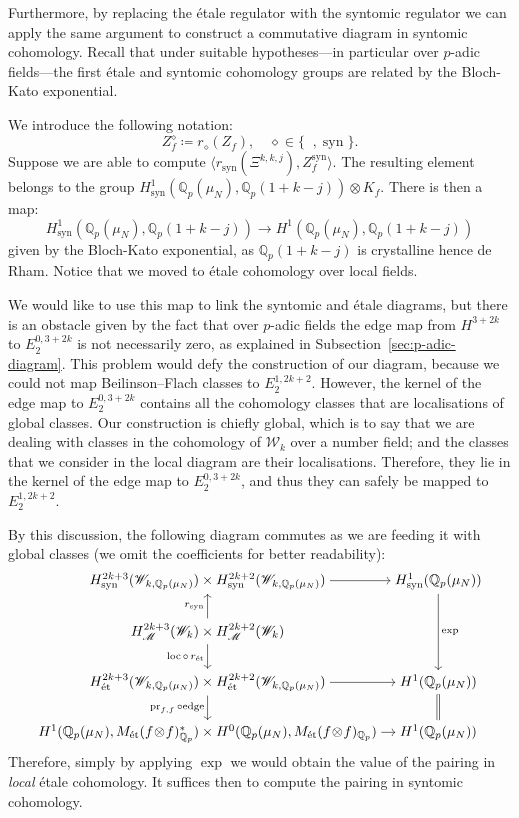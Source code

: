 \documentclass[11pt, a4paper, reqno]{amsart}
\theoremstyle{definition}
\theoremstyle{plain}
\theoremstyle{remark}
\DeclareMathOperator{\et}{\acute{e}t}
\DeclareMathOperator{\syn}{syn}
\DeclareMathOperator{\mot}{\mathscr{M}}
\DeclareMathOperator{\pr}{pr}
\newcommand{\numberset}{\mathbb}
\newcommand{\Q}{\numberset{Q}}
\newcommand{\KS}{\mathscr{W}}
\newcommand{\cBF}{\Xi}
\newcommand{\regulator}[1]{r_{#1}}
\newcommand{\ret}{\regulator{\et}}
\newcommand{\rsyn}{\regulator{\syn}}
\begin{document}
  Furthermore, by replacing the étale regulator with the syntomic regulator we can apply the same argument to construct a commutative diagram in syntomic cohomology. Recall that under suitable hypotheses---in particular over $p$-adic fields---the first étale and syntomic cohomology groups are related by the Bloch-Kato exponential.
  
  We introduce the following notation:
  \[
      Z_f^{\diamond} \coloneqq \regulator{\diamond}(Z_f), \quad \diamond\in\{\et,\syn\}.
  \]
  Suppose we are able to compute $\langle \rsyn(\cBF^{k,k,j}), Z_f^{\syn} \rangle$. The resulting element belongs to the group $H^1_{\syn}(\Q_p(\mu_N), \Q_p(1+k-j))\otimes K_f$. There is then a map:
  \[
   H^1_{\syn}(\Q_p(\mu_N),\Q_p(1+k-j)) \to H^1(\Q_p(\mu_N),\Q_p(1+k-j))
  \]
  given by the Bloch-Kato exponential, as $\Q_p(1+k-j)$ is crystalline hence de Rham. Notice that we moved to étale cohomology over local fields.
  
  We would like to use this map to link the syntomic and étale diagrams, but there is an obstacle given by the fact that over $p$-adic fields the edge map from $H^{3+2k}_{\et}$ to $E_2^{0,3+2k}$ is not necessarily zero, as explained in Subsection~\ref{sec:p-adic-diagram}. This problem would defy the construction of our diagram, because we could not map Beilinson--Flach classes to $E_2^{1,2k+2}$. However, the kernel of the edge map to $E_2^{0,3+2k}$ contains all the cohomology classes that are localisations of global classes. Our construction is chiefly global, which is to say that we are dealing with classes in the cohomology of $\KS_k$ over a number field; and the classes that we consider in the local diagram are their localisations. Therefore, they lie in the kernel of the edge map to $E_2^{0,3+2k}$, and thus they can safely be mapped to $E_2^{1,2k+2}$.
  
  By this discussion, the following diagram commutes as we are feeding it with global classes (we omit the coefficients for better readability):
  \[
      \begin{tikzcd}[column sep=0.7em,cramped]
          H_{\syn}^{2k+3}(\KS_{k,\Q_p(\mu_N)}) \times H_{\syn}^{2k+2}(\KS_{k,\Q_p(\mu_N)}) \arrow{r} & H^1_{\syn}(\Q_p(\mu_N)) \arrow["\exp"]{dd} \\
       H_{\mot}^{2k+3}(\KS_k) \times H_{\mot}^{2k+2}(\KS_k) \arrow["\rsyn"]{u} \arrow["\mathrm{loc}\,\circ\,\ret"']{d} & \\
       H_{\et}^{2k+3}(\KS_{k,\Q_p(\mu_N)}) \times H_{\et}^{2k+2}(\KS_{k,\Q_p(\mu_N)}) \arrow{r} \arrow["\pr_{f,f}\circ\mathrm{edge}"']{d} &  H^1(\Q_p(\mu_N)) \arrow[equal]{d} \\
       H^1(\Q_p(\mu_N),M_{\et}(f\! \otimes\! f)^*_{\Q_p}) \times H^0(\Q_p(\mu_N),M_{\et}(f\! \otimes\! f)_{\Q_p}) \arrow{r} &  H^1(\Q_p(\mu_N))
      \end{tikzcd}
  \]
  Therefore, simply by applying $\exp$ we would obtain the value of the pairing in \emph{local} étale cohomology. It suffices then to compute the pairing in syntomic cohomology.
  
\end{document}
